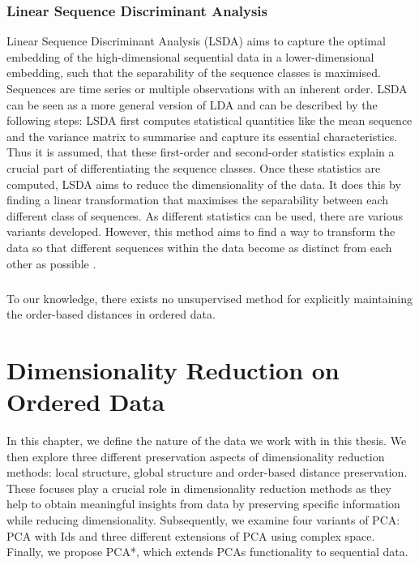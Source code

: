 \documentclass[pdftex,12pt,a4paper]{report}
\begin{document}
\subsection{Linear Sequence Discriminant Analysis}
Linear Sequence Discriminant Analysis (LSDA) aims to capture the optimal embedding of the high-dimensional sequential data in a lower-dimensional embedding, such that the separability of the sequence classes is maximised.
Sequences are time series or multiple observations with an inherent order.
LSDA can be seen as a more general version of LDA and can be described by the following steps:
LSDA first computes statistical quantities like the mean sequence and the variance matrix to summarise and capture its essential characteristics.
Thus it is assumed, that these first-order and second-order statistics explain a crucial part of differentiating the sequence classes.
Once these statistics are computed, LSDA aims to reduce the dimensionality of the data.
It does this by finding a linear transformation that maximises the separability between each different class of sequences.
As different statistics can be used, there are various variants developed.
However, this method aims to find a way to transform the data so that different sequences within the data become as distinct from each other as possible  \cite{lsda}. 


\paragraph*{}
To our knowledge, there exists no unsupervised method for explicitly maintaining the order-based distances in ordered data.


\chapter{Dimensionality Reduction on Ordered Data} \label{dim_red on ordered data}
In this chapter, we define the nature of the data we work with in this thesis.
We then explore three different preservation aspects of dimensionality reduction methods: local structure, global structure and order-based distance preservation.
These focuses play a crucial role in dimensionality reduction methods as they help to obtain meaningful insights from data by preserving specific information while reducing dimensionality.
Subsequently, we examine four variants of PCA: PCA with Ids and three different extensions of PCA using complex space.
Finally, we propose PCA*, which extends PCAs functionality to sequential data.
\end{document}
